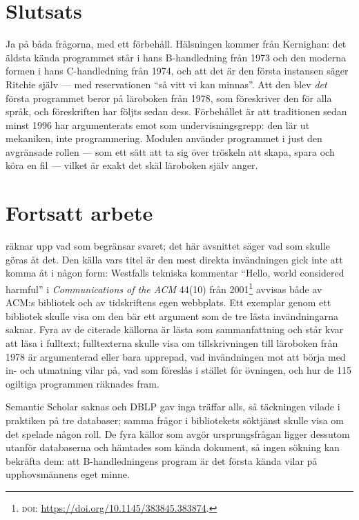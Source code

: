 \section{Slutsats}
\label{sec:hw-slutsats}

Ja på båda frågorna, med ett förbehåll.  Hälsningen kommer från
Kernighan: det äldsta kända programmet står i hans B-handledning från
1973 och den moderna formen i hans C-handledning från 1974, och att det
är den första instansen säger Ritchie själv --- med reservationen
\enquote{så vitt vi kan minnas}.  Att den blev \emph{det} första
programmet beror på läroboken från 1978, som föreskriver den för alla
språk, och föreskriften har följts sedan dess.  Förbehållet är att
traditionen sedan minst 1996 har argumenterats emot som
undervisningsgrepp: den lär ut mekaniken, inte programmering.  Modulen
använder programmet i just den avgränsade rollen --- som ett sätt att ta
sig över tröskeln att skapa, spara och köra en fil --- vilket är exakt det
skäl läroboken själv anger.

\section{Fortsatt arbete}
\label{sec:hw-fortsatt}

 räknar upp vad som begränsar svaret; det här
avsnittet säger vad som skulle göras åt det.  Den källa vars titel är
den mest direkta invändningen gick inte att komma åt i någon form:
Westfalls tekniska kommentar \enquote{Hello, world considered harmful} i
\emph{Communications of the ACM} 44(10) från
2001\footnote{\textsc{doi}: \url{https://doi.org/10.1145/383845.383874}.}
avvisas både av ACM:s bibliotek och av tidskriftens egen webbplats.  Ett
exemplar genom ett bibliotek skulle visa om den bär ett argument som de
tre lästa invändningarna saknar.  Fyra av de citerade källorna är lästa
som sammanfattning\autocite{Sack2025Hello,RosenbergKolling1996,%
Keuning2024Goodbye,Jeffries2022Hello}
och står kvar att läsa i fulltext; fulltexterna skulle visa om
tillskrivningen till läroboken från 1978 är argumenterad eller bara
upprepad, vad invändningen mot att börja med in- och utmatning vilar på,
vad som föreslås i stället för övningen, och hur de 115 ogiltiga
programmen räknades fram.

Semantic Scholar saknas och DBLP gav inga träffar alls, så täckningen
vilade i praktiken på tre databaser; samma frågor i bibliotekets
söktjänst skulle visa om det spelade någon roll.  De fyra källor som
avgör ursprungsfrågan ligger dessutom utanför databaserna och hämtades
som kända dokument, så ingen sökning kan bekräfta dem: att
B-handledningens program är det första kända vilar på upphovsmännens
eget minne.

